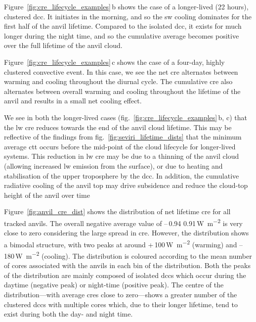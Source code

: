 Figure~\ref{fig:cre_lifecycle_examples}\,b shows the case of a longer-lived (22 hours), clustered \acrshort{dcc}. 
It initiates in the morning, and so the \acrshort{sw} cooling dominates for the first half of the anvil lifetime. 
Compared to the isolated \acrshort{dcc}, it exists for much longer during the night time, and so the cumulative average becomes positive over the full lifetime of the anvil cloud.

Figure~\ref{fig:cre_lifecycle_examples}\,c shows the case of a four-day, highly clustered convective event. 
In this case, we see the net \acrshort{cre} alternates between warming and cooling throughout the diurnal cycle. 
The cumulative \acrshort{cre} also alternates between overall warming and cooling throughout the lifetime of the anvil and results in a small net cooling effect.

We see in both the longer-lived cases (fig.~\ref{fig:cre_lifecycle_examples}\,b, c) that the \acrshort{lw} \acrshort{cre} reduces towards the end of the anvil cloud lifetime. 
This may be reflective of the findings from fig.~\ref{fig:seviri_lifetime_dists} that the minimum average \acrshort{ctt} occurs before the mid-point of the cloud lifecycle for longer-lived systems. 
This reduction in \acrshort{lw} \acrshort{cre} may be due to a thinning of the anvil cloud (allowing increased \acrshort{lw} emission from the surface), or due to heating and stabilisation of the upper troposphere by the \acrshort{dcc}.
In addition, the cumulative radiative cooling of the anvil top may drive subsidence and reduce the cloud-top height of the anvil over time \citep{sokol_tropical_2020}

Figure~\ref{fig:anvil_cre_dist} shows the distribution of net lifetime \acrshort{cre} for all tracked anvils. 
The overall negative average value of --\,0.94\,\textpm\,0.91\,\unit{W m^{-2}} is very close to zero considering the large spread in \acrshort{cre}. 
However, the distribution shows a bimodal structure, with two peaks at around +\,100\,\unit{W m^{-2}} (warming) and --\,180\,\unit{W m^{-2}} (cooling). 
The distribution is coloured according to the mean number of cores associated with the anvils in each bin of the distribution. 
Both the peaks of the distribution are mainly composed of isolated \acrshort{dcc}s which occur during the daytime (negative peak) or night-time (positive peak). 
The centre of the distribution---with average \acrshort{cre}s close to zero---shows a greater number of the clustered \acrshort{dcc}s with multiple cores which, due to their longer lifetime, tend to exist during both the day- and night time.


